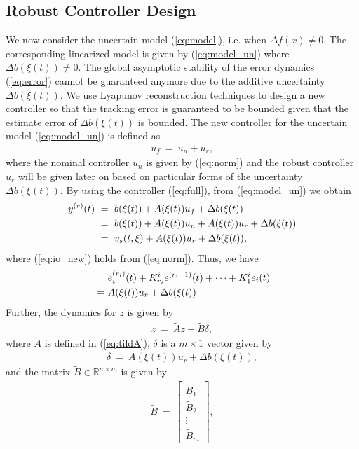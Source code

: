 \documentclass[twoside,leqno,onecolumn]{article}
\begin{document}
\subsection{Robust Controller Design} \label{sec:robust} We now
consider the uncertain model (\ref{eq:model}), i.e. when $\Delta
f(x)\neq0$. The corresponding linearized model is given by
(\ref{eq:model_un}) where $\Delta b (\xi(t))\neq0$. The global
asymptotic stability of the error dynamics (\ref{eq:error}) cannot
be guaranteed anymore due to the additive uncertainty $\Delta
b(\xi(t))$. We use Lyapunov reconstruction techniques to design a
new controller so that the tracking error is guaranteed to be
bounded given that the estimate error of $\Delta b(\xi(t))$ is
bounded. The new controller for the uncertain model
(\ref{eq:model_un}) is defined as
\begin{align}
\label{eq:full}
u_{f}~=~u_{n} + u_{r},
\end{align}
where the nominal controller $u_{n}$ is given by (\ref{eq:norm})
and the robust controller $u_r$ will be given later on based on
particular forms of the uncertainty $\Delta b(\xi(t))$. By using
the controller (\ref{eq:full}), from (\ref{eq:model_un}) we obtain
\begin{align}
\label{eq:io_new}
y^{(r)}(t) &~=~ b(\xi(t)) + A (\xi(t)) u_{f} + \Delta b(\xi(t))\notag\\
&~=~ b(\xi(t)) + A (\xi(t)) u_{n} + A (\xi(t)) u_{r}+ \Delta b(\xi(t))\notag\\
& ~=~v_{s}(t,\xi)+ A (\xi(t)) u_{r}+ \Delta b(\xi(t)),
\end{align}
where (\ref{eq:io_new}) holds from (\ref{eq:norm}). Thus, we have
\begin{align}
\label{eq:error_new}
&~e_i^{(r_i)}(t) +  K^i_{r_i}e^{(r_i-1)}(t) + \cdots + K^i_1e_i(t)\notag\\
~=&~A (\xi(t)) u_{r}+ \Delta b(\xi(t))
\end{align}
Further, the dynamics for $z$ is given by
\begin{align}
\label{eq:dyn_z}
\dot{z}~=~ \tilde{A} z + \tilde{B} \delta,
\end{align}where $\tilde{A}$ is defined in (\ref{eq:tildA}), $\delta$ is a $m\times 1$ vector given by
\begin{align}
\label{eq:delta} \delta~=~A (\xi(t)) u_{r}+ \Delta b(\xi(t)),
\end{align}
and the matrix $\tilde B\in\mathbb{R}^{n\times m}$ is given by
\begin{align}
\label{eq:tildB}
\tilde{B}~=~\left[ \begin{array}{c}
\tilde{B}_1 \\
\tilde{B}_2\\
\vdots\\
\tilde{B}_m
\end{array} \right],
\end{align}
\end{document}

